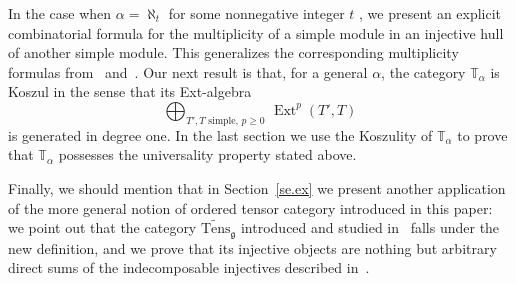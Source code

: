 \documentclass[11pt]{article}
\theoremstyle{plain}
\theoremstyle{nonumberplain}
\theoremstyle{plain}
\theoremstyle{nonumberplain}
\newcommand\bT{\mathbb T}
\newcommand\fg{\mathfrak{g}}
\DeclareMathOperator{\ext}{\mathrm{Ext}}
\begin{document}
In the case when $\alpha=\aleph_t$ for some nonnegative integer $t$ , we present an explicit combinatorial formula for the multiplicity of a simple module in an injective hull of another simple module.  This generalizes the corresponding multiplicity formulas from~\cite{PS} and~\cite{us2}.  Our next result is that, for a general $\alpha$, the
category $\bT_\alpha$ is Koszul in the sense that its Ext-algebra
\begin{equation*}
	\bigoplus_{T',T\text{ simple},\,p\geq 0}\,\ext^p\left(T',T\right)  
\end{equation*}
is generated in degree one.  In the last section we use the Koszulity of $\mathbb{T}_\alpha$ to prove that $\mathbb{T}_\alpha$ possesses the universality property stated above.  

Finally, we should mention that in Section~\ref{se.ex} we present another application of the more general notion of ordered tensor category introduced in this paper: we point out that the category $\widetilde{\mathrm{Tens}}_{\fg}$ introduced and studied in~\cite{PS1} falls under the new definition, and we prove that its injective objects are nothing but arbitrary direct sums of the indecomposable injectives described in~\cite{PS1}.  
\end{document}
